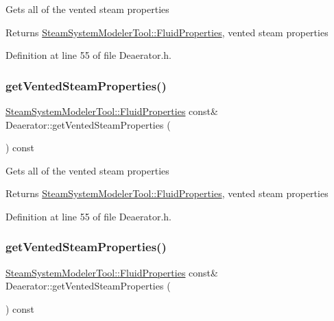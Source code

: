 Gets all of the vented steam properties \begin{DoxyReturn}{Returns}
\hyperlink{struct_steam_system_modeler_tool_1_1_fluid_properties}{Steam\+System\+Modeler\+Tool\+::\+Fluid\+Properties}, vented steam properties 
\end{DoxyReturn}


Definition at line 55 of file Deaerator.\+h.

\mbox{\label{class_deaerator_a576a4632452268f77839334d87d5abff}} 
\subsubsection{\texorpdfstring{get\+Vented\+Steam\+Properties()}{getVentedSteamProperties()}\hspace{0.1cm}{\footnotesize\ttfamily [2/3]}}
{\footnotesize\ttfamily \hyperlink{struct_steam_system_modeler_tool_1_1_fluid_properties}{Steam\+System\+Modeler\+Tool\+::\+Fluid\+Properties} const\& Deaerator\+::get\+Vented\+Steam\+Properties (\begin{DoxyParamCaption}{ }\end{DoxyParamCaption}) const\hspace{0.3cm}{\ttfamily [inline]}}

Gets all of the vented steam properties \begin{DoxyReturn}{Returns}
\hyperlink{struct_steam_system_modeler_tool_1_1_fluid_properties}{Steam\+System\+Modeler\+Tool\+::\+Fluid\+Properties}, vented steam properties 
\end{DoxyReturn}


Definition at line 55 of file Deaerator.\+h.

\mbox{\label{class_deaerator_a576a4632452268f77839334d87d5abff}} 
\subsubsection{\texorpdfstring{get\+Vented\+Steam\+Properties()}{getVentedSteamProperties()}\hspace{0.1cm}{\footnotesize\ttfamily [3/3]}}
{\footnotesize\ttfamily \hyperlink{struct_steam_system_modeler_tool_1_1_fluid_properties}{Steam\+System\+Modeler\+Tool\+::\+Fluid\+Properties} const\& Deaerator\+::get\+Vented\+Steam\+Properties (\begin{DoxyParamCaption}{ }\end{DoxyParamCaption}) const\hspace{0.3cm}{\ttfamily [inline]}}

